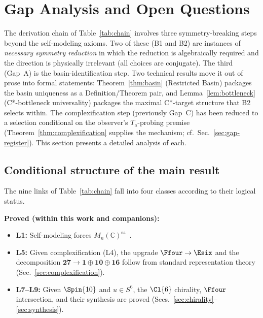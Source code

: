 
\section{Gap Analysis and Open Questions}\label{sec:gaps}

The derivation chain of Table~\ref{tab:chain} involves three
symmetry-breaking steps beyond the self-modeling axioms.  Two of
these (B1 and B2) are instances of \emph{necessary symmetry reduction}
in which the reduction is algebraically required and the direction is
physically irrelevant (all choices are conjugate).  The third
(Gap~A) is the basin-identification step.  Two technical results
move it out of prose into formal statements: Theorem~\ref{thm:basin}
(Restricted Basin) packages the basin uniqueness as a
Definition/Theorem pair, and Lemma~\ref{lem:bottleneck} (C*-bottleneck
universality) packages the maximal C*-target structure that B2
selects within.  The complexification step (previously Gap~C) has
been reduced to a selection conditional on the observer's $T_a$-probing premise (Theorem~\ref{thm:complexification} supplies the mechanism; cf.~Sec.~\ref{sec:gap-register}).  This section
presents a detailed analysis of each.

\subsection{Conditional structure of the main result}\label{sec:conditional}

The nine links of Table~\ref{tab:chain} fall into four classes
according to their logical status.

\medskip
\noindent\textbf{Proved (within this work and companions):}
\begin{itemize}
  \item \textbf{L1:} Self-modeling forces
    $M_n(\mathbb{C})^{\mathrm{sa}}$~\cite{Paper5}.
  \item \textbf{L5:} Given complexification (L4), the upgrade
    $\Ffour\to\Esix$ and the decomposition
    $\mathbf{27}\to\mathbf{1}\oplus\mathbf{10}\oplus\mathbf{16}$
    follow from standard representation theory
    (Sec.~\ref{sec:complexification}).
  \item \textbf{L7--L9:} Given $\Spin{10}$ and $u\in S^6$, the
    $\Cl{6}$ chirality, $\Ffour$ intersection, and their synthesis
    are proved (Secs.~\ref{sec:chirality}--\ref{sec:synthesis}).
\end{itemize}

